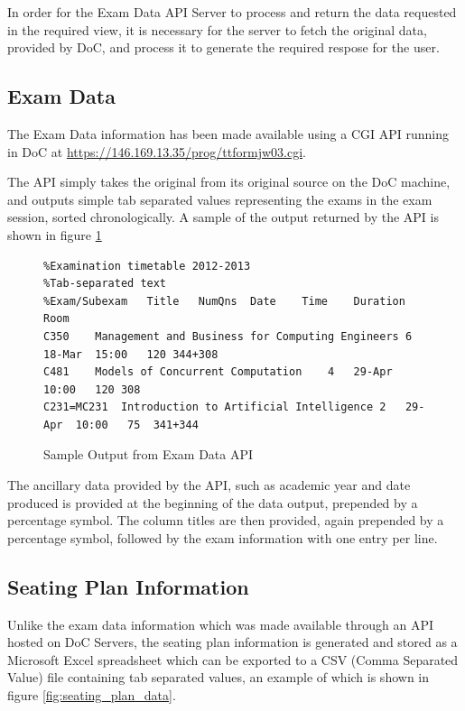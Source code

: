 In order for the Exam Data API Server to process and return the data requested in the required view, it is necessary for the server to fetch the original data, provided by DoC, and process it to generate the required respose for the user.

\subsection{Exam Data}
\label{subsec:examData}

\FloatBarrier

The Exam Data information has been made available using a CGI API running in DoC at \url{https://146.169.13.35/prog/ttformjw03.cgi}.

The API simply takes the original from its original source on the DoC machine, and outputs simple tab separated values representing the exams in the exam session, sorted chronologically.  A sample of the output returned by the API is shown in figure \ref{fig:exam_data_api}

\begin{figure}[!htbp]
\centering
\begin{lstlisting}[tabsize=2,breaklines=true]
%Printed at Sat Jun 14 11:57:47 BST 2014
%Examination timetable 2012-2013
%Tab-separated text
%Exam/Subexam	Title	NumQns	Date	Time	Duration	Room
C350	Management and Business for Computing Engineers	6	18-Mar	15:00	120	344+308
C481	Models of Concurrent Computation	4	29-Apr	10:00	120	308
C231=MC231	Introduction to Artificial Intelligence	2	29-Apr	10:00	75	341+344
\end{lstlisting}
\caption{Sample Output from Exam Data API}
\label{fig:exam_data_api}
\end{figure}

The ancillary data provided by the API, such as academic year and date produced is provided at the beginning of the data output, prepended by a percentage symbol.  The column titles are then provided, again prepended by a percentage symbol, followed by the exam information with one entry per line.

\FloatBarrier

\subsection{Seating Plan Information}

\FloatBarrier

Unlike the exam data information which was made available through an API hosted on DoC Servers, the seating plan information is generated and stored as a Microsoft Excel spreadsheet which can be exported to a CSV (Comma Separated Value) file containing tab separated values, an example of which is shown in figure \ref{fig:seating_plan_data}.

